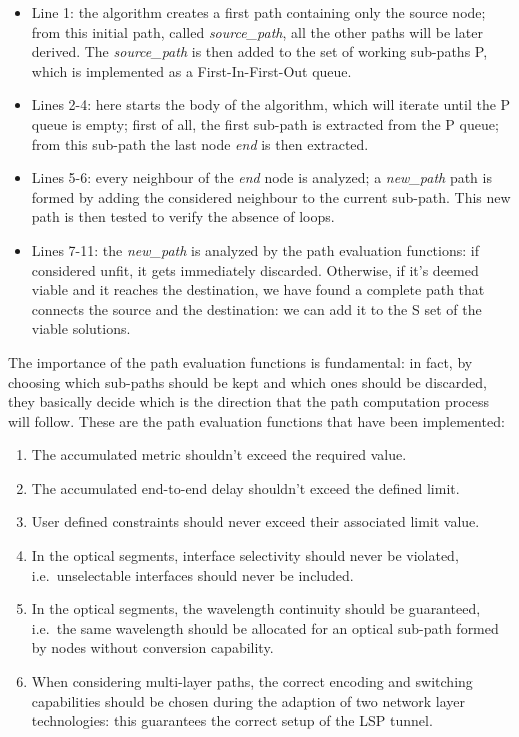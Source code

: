 \documentclass[10pt,a4paper]{report}
\begin{document}
\begin{itemize}
\item Line 1: the algorithm creates a first path containing only the
  source node; from this initial path, called \textit{source\_path},
  all the other paths will be later derived. The \textit{source\_path}
  is then added to the set of working sub-paths P, which is
  implemented as a First-In-First-Out queue.
\item Lines 2-4: here starts the body of the algorithm, which will
  iterate until the P queue is empty; first of all, the first sub-path
  is extracted from the P queue; from this sub-path the last node
  \textit{end} is then extracted.
\item Lines 5-6: every neighbour of the \textit{end} node is analyzed;
  a \textit{new\_path} path is formed by adding the considered
  neighbour to the current sub-path. This new path is then tested to
  verify the absence of loops.
\item Lines 7-11: the \textit{new\_path} is analyzed by the path
  evaluation functions: if considered unfit, it gets immediately
  discarded. Otherwise, if it's deemed viable and it reaches the
  destination, we have found a complete path that connects the source
  and the destination: we can add it to the S set of the viable
  solutions.
\end{itemize}

The importance of the path evaluation functions is fundamental: in
fact, by choosing which sub-paths should be kept and which ones should
be discarded, they basically decide which is the direction that the
path computation process will follow. These are the path evaluation
functions that have been implemented:

\begin{enumerate}
\item The accumulated metric shouldn't exceed the required value.
\item The accumulated end-to-end delay shouldn't exceed the defined
  limit.
\item User defined constraints should never exceed their associated
  limit value.
\item In the optical segments, interface selectivity should never be
  violated, i.e.\ unselectable interfaces should never be included.
\item In the optical segments, the wavelength continuity should be
  guaranteed, i.e.\ the same wavelength should be allocated for an
  optical sub-path formed by nodes without conversion capability.
\item When considering multi-layer paths, the correct encoding and
  switching capabilities should be chosen during the adaption of two
  network layer technologies: this guarantees the correct setup of the
  LSP tunnel.
\end{enumerate}
\end{document}
